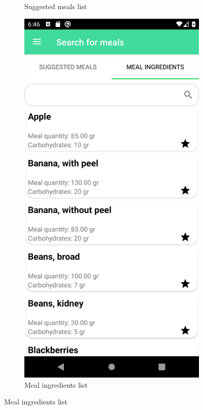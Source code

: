 \begin{figure}[H]
\begin{center}
\begin{subfigure}{.3\textwidth}
            \caption{Suggested meals list} 
        \end{subfigure}
        \begin{subfigure}{.3\textwidth}
            \includegraphics[scale=0.1, width=\textwidth]{_figures/meal_ingredients.png}
            \caption{Meal ingredients list} 
        \end{subfigure}%
    \end{center}
\end{figure}


